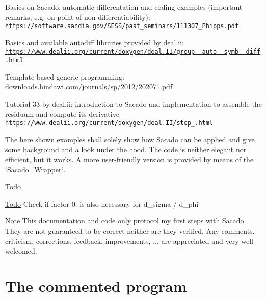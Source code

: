 \begin{DoxyItemize}
\item Basics on Sacado, automatic differentation and coding examples (important remarks, e.\+g. on point of non-\/differentiability)\+: ~\newline
 \href{https://software.sandia.gov/SESS/past_seminars/111307_Phipps.pdf}{\tt https\+://software.\+sandia.\+gov/\+S\+E\+S\+S/past\+\_\+seminars/111307\+\_\+\+Phipps.\+pdf}
\item Basics and available autodiff libraries provided by deal.\+ii\+: ~\newline
 \href{https://www.dealii.org/current/doxygen/deal.II/group__auto__symb__diff.html}{\tt https\+://www.\+dealii.\+org/current/doxygen/deal.\+I\+I/group\+\_\+\+\_\+auto\+\_\+\+\_\+symb\+\_\+\+\_\+diff.\+html}
\item Template-\/based generic programming\+: ~\newline
 downloads.\+hindawi.\+com/journals/sp/2012/202071.pdf
\item Tutorial 33 by deal.\+ii\+: introduction to Sacado and implementation to assemble the residuum and compute its derivative ~\newline
 \href{https://www.dealii.org/current/doxygen/deal.II/step_33.html}{\tt https\+://www.\+dealii.\+org/current/doxygen/deal.\+I\+I/step\+\_.\+html}
\end{DoxyItemize}

The here shown examples shall solely show how Sacado can be applied and give some background and a look under the hood. The code is neither elegant nor efficient, but it works. A more user-\/friendly version is provided by means of the \char`\"{}\+Sacado\+\_\+\+Wrapper\char`\"{}. ~\newline
\begin{DoxyRefDesc}{Todo}
\item[\hyperlink{todo__todo000002}{Todo}]Check if factor 0. is also necessary for d\+\_\+sigma / d\+\_\+phi\end{DoxyRefDesc}


\begin{DoxyNote}{Note}
This documentation and code only protocol my first steps with Sacado. They are not guaranteed to be correct neither are they verified. Any comments, criticism, corrections, feedback, improvements, ... are appreciated and very well welcomed.
\end{DoxyNote}
\hypertarget{index_code}{}\section{The commented program}\label{index_code}

